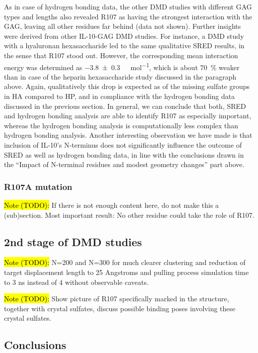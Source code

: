 As in case of hydrogen bonding data, the other DMD studies with different GAG
types and lengths also revealed R107 as having the strongest interaction with
the GAG, leaving all other residues far behind (data not shown). Further
insights were derived from other IL-10-GAG DMD studies. For instance, a DMD
study with a hyaluronan hexasaccharide led to the same qualitative SRED results,
in the sense that R107 stood out. However, the corresponding mean interaction
energy was determined as \SI{-3.8 +- 0.3}{\kilo\calory\per\mol}, which is about
\SI{70}{\percent} weaker than in case of the heparin hexasaccharide study
discussed in the paragraph above. Again, qualitatively this drop is expected as
of the missing sulfate groups in HA compared to HP, and in compliance with the
hydrogen bonding data discussed in the previous section. In general, we can
conclude that both, SRED and hydrogen bonding analysis are able to identify R107
as especially important, whereas the hydrogen bonding analysis is
computationally less complex than hydrogen bonding analysis. Another interesting
observation we have made is that inclusion of IL-10's N-terminus does not
significantly influence the outcome of SRED as well as hydrogen bonding data, in
line with the conclusions drawn in the \enquote{Impact of N-terminal residues
and modest geometry changes} part above.



\subsubsection{R107A mutation}

\hl{Note (TODO):}
If there is not enough content here, do not make this a (sub)section.
Most important result: No other residue could take the role of R107.


\subsection{2nd stage of DMD studies}

\hl{Note (TODO):}
N=200 and N=300 for much clearer clustering and reduction of target displacement
length to 25 Angstroms and pulling process simulation time to 3 ns instead of 4
without observable caveats.

\hl{Note (TODO):}
Show picture of R107 specifically marked in the structure, together with
crystal sulfates, discuss possible binding poses involving these crystal
sulfates.


\subsection{Conclusions}

